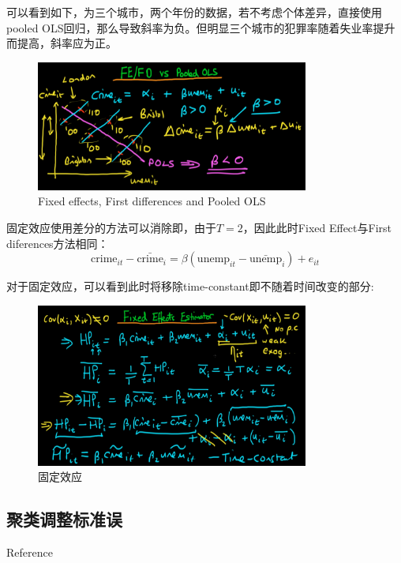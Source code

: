 \documentclass[11pt]{article}
\begin{document}
可以看到如下，为三个城市，两个年份的数据，若不考虑个体差异，直接使用pooled OLS回归，那么导致斜率为负。但明显三个城市的犯罪率随着失业率提升而提高，斜率应为正。
\begin{figure}[H]
    \centering
    \includegraphics[width=0.8\textwidth]{fig/fe-fo-pooled-ols.png}
    \caption{Fixed effects, First differences and Pooled OLS}
    \label{fig:fe-fo-pooled-ols}
\end{figure}

固定效应使用差分的方法可以消除即，由于$T=2$，因此此时Fixed Effect与First diferences方法相同：
\begin{equation*}
    \text{crime}_{it} - \bar{\text{crime}}_i = \beta(\text{unemp}_{it} - \bar{\text{unemp}}_i) + e_{it}
\end{equation*}

对于固定效应，可以看到此时将移除time-constant即不随着时间改变的部分:
\begin{figure}[H]
    \centering
    \includegraphics[width=0.8\textwidth]{fig/fixed-effects.png}
    \caption{固定效应}
    \label{fig:fixed-effects}
\end{figure}


\subsection{聚类调整标准误}

Reference
\end{document}

